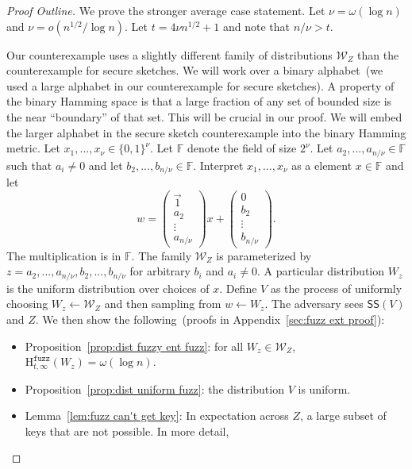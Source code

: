 \documentclass[11pt]{article}
\newcommand{\apref}[1]{\mbox{Appendix~\ref{#1}}}
\newcommand{\lemref}[1]{\mbox{Lemma~\ref{#1}}}
\newcommand{\propref}[1]{\mbox{Proposition~\ref{#1}}}
\newcommand{\class}[1]{{\ensuremath{\mathsf{#1}}}}
\newcommand{\sketch}{\ensuremath{\class{SS}}\xspace}
\newcommand{\zo}{\ensuremath{\{0, 1\}}}
\newcommand{\Hfuzz}{\mathrm{H}^{\mathtt{fuzz}}_{t,\infty}}
\begin{document}
\begin{proof}[Proof Outline]
We prove the stronger average case statement.
Let $\nu = \omega(\log n)$ and $\nu = o(n^{1/2}/\log n)$.  Let $t=4\nu n^{1/2}+1$ and note that $n/\nu >t$.  

Our counterexample uses a slightly different family of distributions $\mathcal{W}_Z$ than the counterexample for secure sketches.  
We will work over a binary alphabet~(we used a large alphabet in our counterexample for secure sketches).  A  property of the binary Hamming space is that a large fraction of any set of bounded size is the near ``boundary'' of that set.  This will be crucial in our proof.  We will embed the larger alphabet in the secure sketch counterexample into the binary Hamming metric.
Let $x_1,..., x_\nu \in \zo^\nu$.  Let $\mathbb{F}$ denote the field of size $2^{\nu}$.  Let $a_2,..., a_{n/\nu}\in\mathbb{F}$ such that $a_i\neq 0$ and let $b_2,..., b_{n/\nu}\in\mathbb{F}$.  
Interpret $x_1,..., x_{\nu}$ as a element $x\in \mathbb{F}$ and let 
\[w =  \begin{pmatrix} \vec{1} \\a_2  \\ \vdots \\ a_{n/\nu} \end{pmatrix} x + \begin{pmatrix} 0  \\ 
b_2\\ \vdots \\ b_{n/\nu} \end{pmatrix} .
\]
The multiplication is in $\mathbb{F}$.  The family $\mathcal{W}_Z$ is parameterized by $z = a_2,..., a_{n/\nu}, b_2,..., b_{n/\nu}$ for arbitrary $b_i$ and $a_i\neq 0$.  
A particular distribution $W_z$ is the uniform distribution over choices of $x$.
 Define $V$ as the process of uniformly choosing $W_z\leftarrow \mathcal{W}_Z$ and then sampling from $w\leftarrow W_z$.  The adversary sees $\sketch(V)$  and $Z$.  We then show the following~(proofs in \apref{sec:fuzz ext proof}):
\begin{itemize}
\item \propref{prop:dist fuzzy ent fuzz}: for all $W_z\in \mathcal{W}_Z$, $\Hfuzz(W_z) = \omega (\log n)$. 
\item \propref{prop:dist uniform fuzz}: the distribution $V$ is uniform.
\item \lemref{lem:fuzz can't get key}: In expectation across $Z$, a large subset of keys that are not possible.  In more detail,
\begin{itemize}

\end{itemize}
\end{itemize}
\end{proof}
\end{document}
